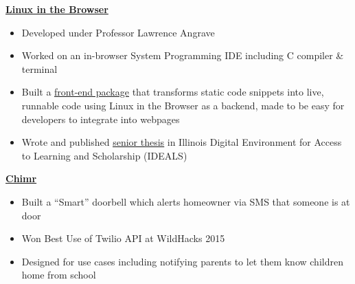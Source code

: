 \documentclass[10pt,a4paper,sans]{moderncv}        %
\begin{document}
\vspace{3pt}
\textbf{\href{http://cs-education.github.io/sys/}{Linux in the Browser}}
\begin{itemize}
  \item Developed under Professor Lawrence Angrave
  \item Worked on an in-browser System Programming IDE including C compiler \& terminal
  \item Built a {\color{blue}\underline{\href{https://cs-education.github.io/elc-dev/}{front-end package}}} that transforms static code snippets into live, runnable
        code using Linux in the Browser as a backend, made to be easy for developers to integrate into
        webpages
  \item Wrote and published {\color{blue}\underline{\href{https://www.ideals.illinois.edu/handle/2142/96030}{senior thesis}}} in Illinois Digital Environment for Access to Learning and Scholarship (IDEALS)
\end{itemize}

\vspace{3pt}
\textbf{\href{http://devpost.com/software/chimr}{Chimr}}
\begin{itemize}
  \item Built a ``Smart'' doorbell which alerts homeowner via SMS that someone is at door
  \item Won Best Use of Twilio API at WildHacks 2015
  \item Designed for use cases including notifying parents to let them know children home from school
\end{itemize}

% 


\end{document}
